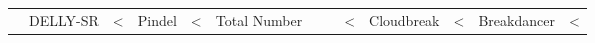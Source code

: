 \begin{table}
\begin{center}
\begin{tabular}{r|rrr|rrrrr}
&  DELLY-SR & <%
&  Pindel & <%
\hline
{} & Total Number & & & <%
& Cloudbreak & <%
& Breakdancer & <%

\end{tabular}
\end{center}
\end{table}
